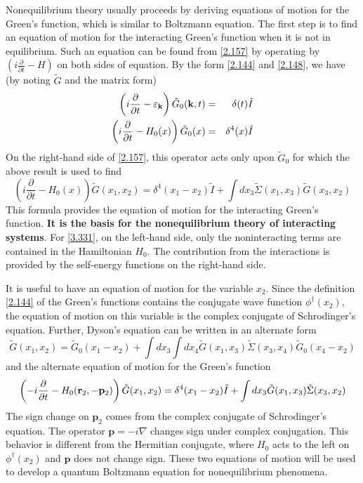 Nonequilibrium theory usually proceeds by deriving equations of motion for the Green's function, which is similar to Boltzmann equation.
The first step is to find an equation of motion for the interacting Green's function when it is not in equilibrium.
Such an equation can be found from \eqref{2.157} by operating by $\left(i \frac{\partial}{\partial t} -H \right)$ on both sides of equation.
By the form \eqref{2.144} and \eqref{2.148}, we have (by noting $\tilde{G}$ and the matrix form)
\begin{eqnarray}
    \left( i \frac{\partial}{\partial t} - \varepsilon_{\mathbf{k}} \right) \tilde{G}_0 (\mathbf{k},t)  &=& \delta(t) \tilde{I}     \label{3.329} \\
    \left( i \frac{\partial}{\partial t} - H_0(x) \right) \tilde{G}_0(x) &=& \delta^4(x) \tilde{I}      \label{3.330}
\end{eqnarray}
On the right-hand side of \eqref{2.157}, this operator acts only upon $\tilde{G}_0$ for which the above result is used to find
\begin{equation}
    \left( i \frac{\partial}{\partial t} - H_0(x) \right) \tilde{G}(x_1,x_2) = \delta^4(x_1-x_2) \tilde{I} + \int dx_3 \tilde{\Sigma}(x_1,x_3) \tilde{G}(x_3,x_2)       \label{3.331}
\end{equation}
This formula provides the equation of motion for the interacting Green's function.
\textbf{It is the basis for the nonequilibrium theory of interacting systems}.
For \eqref{3.331}, on the left-hand side, only the noninteracting terms are contained in the Hamiltonian $H_0$.
The contribution from the interactions is provided by the self-energy functions on the right-hand side.

It is useful to have an equation of motion for the variable $x_2$.
Since the definition \eqref{2.144} of the Green's functions contains the conjugate wave function $\phi^\dagger(x_2)$, the equation of motion on this variable is the complex conjugate of Schrodinger's equation.
Further, Dyson's equation can be written in an alternate form
\begin{equation}
    \tilde{G}(x_1,x_2) = \tilde{G}_0(x_1-x_2) + \int dx_3 \int dx_4 \tilde{G}(x_1,x_3) \tilde{\Sigma}(x_3,x_4) \tilde{G}_0 (x_4-x_2)
\end{equation}
and the alternate equation of motion for the Green's function
\begin{equation}
    \left( -i \frac{\partial}{\partial t}  - H_0(\mathbf{r}_2,-\mathbf{p}_2) \right) \tilde{G}(x_1,x_2) = \delta^4(x_1-x_2) \tilde{I} + \int dx_3 \tilde{G}(x_1,x_3) \tilde{\Sigma}(x_3,x_2)   \label{3.332}
\end{equation}
The sign change on $\mathbf{p}_2$ comes from the complex conjugate of Schrodinger's equation.
The operator $\mathbf{p}=-i\nabla$ changes sign under complex conjugation.
This behavior is different from the Hermitian conjugate, where $H_0$ acts to the left on $\phi^\dagger(x_2)$ and $\mathbf{p}$ does not change sign.
These two equations of motion will be used to develop a quantum Boltzmann equation for nonequilibrium phenomena.

